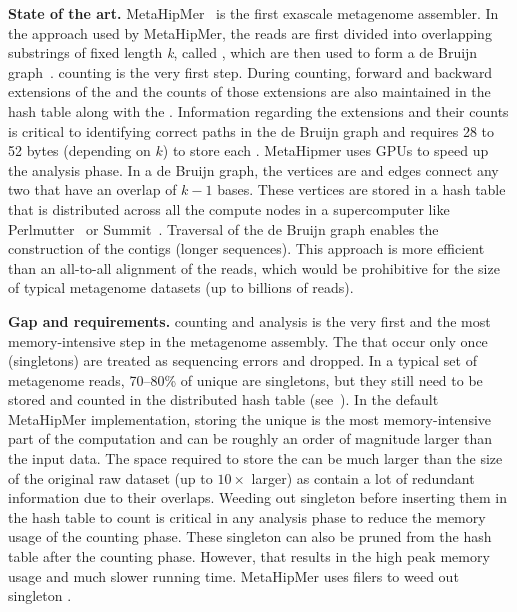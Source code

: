 \noindent
\textbf{State of the art.}
MetaHipMer~\cite{GeorganasEHG18,hofmeyr2020terabase} is the first exascale metagenome assembler.
In the approach used by MetaHipMer, the reads are first divided into overlapping substrings of fixed length \emph{k}, called \emph{\kmers}, which are then used to form a de Bruijn graph~\cite{CompeauPeTe11}.
\Kmer counting is the very first step. During \kmer counting, forward and backward extensions of the \kmer and the counts of those extensions are also maintained in the hash table along with the \kmer. Information regarding the extensions and their counts is critical to identifying correct paths in the de Bruijn graph and requires 28 to 52 bytes (depending on $k$) to store each \kmer.
MetaHipmer uses GPUs to speed up the \kmer analysis phase.
In a de Bruijn graph, the vertices are \kmers and edges connect any two \kmers that have an overlap of $k-1$ bases. These vertices are stored in a hash table that is distributed across all the compute nodes in a supercomputer like Perlmutter~\cite{perlmutter} or Summit~\cite{summit}.
Traversal of the de Bruijn graph enables the construction of the contigs (longer sequences).  This approach is more efficient than an all-to-all alignment of the reads, which would be prohibitive for the size of typical metagenome datasets (up to billions of reads).

\noindent
\textbf{Gap and requirements.}
\Kmer counting and analysis is the very first and the most memory-intensive step in the metagenome assembly. The \kmers that occur only once (singletons) are treated as sequencing errors and dropped. In a typical set of metagenome reads, 70--80\% of unique \kmers are singletons, but they still need to be stored and counted in the distributed hash table (see~).
In the default MetaHipMer implementation, storing the unique \kmers is the most memory-intensive part of the computation and can be roughly an order of magnitude larger than the input data.  The space required to store the \kmers can be much larger than the size of the original raw dataset (up to $10\times$ larger) as \kmers contain a lot of redundant information due to their overlaps.
Weeding out singleton \kmers before inserting them in the hash table to count is critical in any \kmer analysis phase to reduce the memory usage of the counting phase. These singleton \kmers can also be pruned from the hash table after the counting phase. However, that results in the high peak memory usage and much slower running time. MetaHipMer uses filers to weed out singleton \kmers.

